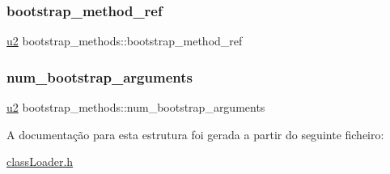 \mbox{\label{structbootstrap__methods_a480411f5ca41d770aa9ce24ee7e8e1e8}} 
\subsubsection{\texorpdfstring{bootstrap\+\_\+method\+\_\+ref}{bootstrap\_method\_ref}}
{\footnotesize\ttfamily \hyperlink{util_8h_a55ef8d87fd202b8417704c089899c5b9}{u2} bootstrap\+\_\+methods\+::bootstrap\+\_\+method\+\_\+ref}

\mbox{\label{structbootstrap__methods_aad28739e25a094400551fd1080fdb1f6}} 
\subsubsection{\texorpdfstring{num\+\_\+bootstrap\+\_\+arguments}{num\_bootstrap\_arguments}}
{\footnotesize\ttfamily \hyperlink{util_8h_a55ef8d87fd202b8417704c089899c5b9}{u2} bootstrap\+\_\+methods\+::num\+\_\+bootstrap\+\_\+arguments}



A documentação para esta estrutura foi gerada a partir do seguinte ficheiro\+:\begin{DoxyCompactItemize}
\item 
\hyperlink{class_loader_8h}{class\+Loader.\+h}\end{DoxyCompactItemize}
